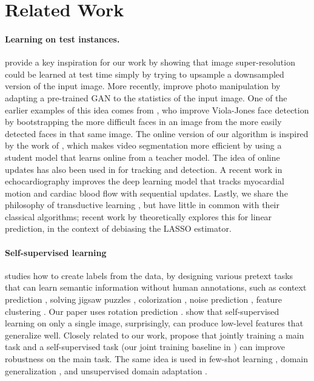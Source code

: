 \section{Related Work}
\label{related}

\paragraph{Learning on test instances.}
\citet{shocher2018zero} provide a key inspiration for our work by showing that image super-resolution could be learned at test time simply by trying to upsample a downsampled version of the input image. More recently, \citet{bau2019semantic} improve photo manipulation by adapting a pre-trained GAN to the statistics of the input image.   One of the earlier examples of this idea comes from \citet{jain2011online}, who improve Viola-Jones face detection \citep{viola2001rapid} by bootstrapping the more difficult faces in an image from the more easily detected faces in that same image. 
The online version of our algorithm is inspired by the work of \citet{mullapudi2018online}, which makes video segmentation more efficient by using a student model that learns online from a teacher model.
The idea of online updates has also been used in \citet{kalal2011tracking} for tracking and detection.
A recent work in echocardiography \citep{zhu2019neural} improves the deep learning model that tracks myocardial motion and cardiac blood flow with sequential updates.
Lastly, we share the philosophy of transductive learning \citep{vapnik2013nature, gammerman1998learning}, but have little in common with their classical algorithms;
recent work by \citet{nilesh} theoretically explores this for linear prediction, in the context of debiasing the LASSO estimator.

\paragraph{Self-supervised learning} studies how to create labels from the data, by designing various pretext tasks that can learn semantic information without human annotations, 
such as context prediction \citep{doersch2015unsupervised}, solving jigsaw puzzles \citep{noroozi2016unsupervised}, colorization \citep{larsson2017colorproxy,zhang2016colorful}, noise prediction \citep{bojanowski2017unsupervised}, feature clustering \citep{caron2018deep}. 
Our paper uses rotation prediction \citep{gidaris2018unsupervised}.
\citet{asano2019surprising} show that self-supervised learning on only a single image, surprisingly, can produce low-level features that generalize well.
Closely related to our work, \citet{hendrycks2019using} propose that jointly training a main task and a self-supervised task (our joint training baseline in ) can improve robustness on the main task.
The same idea is used in few-shot learning  \citep{su2019boosting}, domain generalization \citep{carlucci2019domain}, and unsupervised domain adaptation \citep{sun2019uda}.

